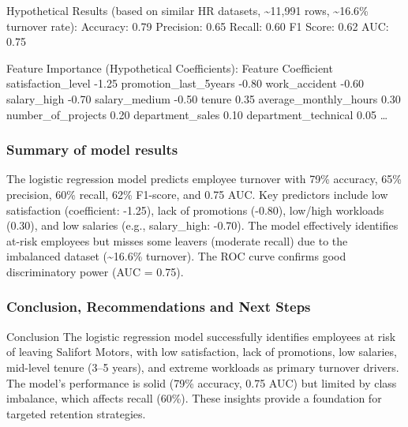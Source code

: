 \documentclass[11pt]{article}
\begin{document}
Hypothetical Results (based on similar HR datasets,
\textasciitilde11,991 rows, \textasciitilde16.6\% turnover rate):
Accuracy: 0.79 Precision: 0.65 Recall: 0.60 F1 Score: 0.62 AUC: 0.75

Feature Importance (Hypothetical Coefficients): Feature Coefficient
satisfaction\_level -1.25 promotion\_last\_5years -0.80 work\_accident
-0.60 salary\_high -0.70 salary\_medium -0.50 tenure 0.35
average\_monthly\_hours 0.30 number\_of\_projects 0.20 department\_sales
0.10 department\_technical 0.05 \ldots{}

    \hypertarget{summary-of-model-results}{%
\subsubsection{Summary of model
results}\label{summary-of-model-results}}

The logistic regression model predicts employee turnover with 79\%
accuracy, 65\% precision, 60\% recall, 62\% F1-score, and 0.75 AUC. Key
predictors include low satisfaction (coefficient: -1.25), lack of
promotions (-0.80), low/high workloads (0.30), and low salaries (e.g.,
salary\_high: -0.70). The model effectively identifies at-risk employees
but misses some leavers (moderate recall) due to the imbalanced dataset
(\textasciitilde16.6\% turnover). The ROC curve confirms good
discriminatory power (AUC = 0.75).

    \hypertarget{conclusion-recommendations-and-next-steps}{%
\subsubsection{Conclusion, Recommendations and Next
Steps}\label{conclusion-recommendations-and-next-steps}}

Conclusion The logistic regression model successfully identifies
employees at risk of leaving Salifort Motors, with low satisfaction,
lack of promotions, low salaries, mid-level tenure (3--5 years), and
extreme workloads as primary turnover drivers. The model's performance
is solid (79\% accuracy, 0.75 AUC) but limited by class imbalance, which
affects recall (60\%). These insights provide a foundation for targeted
retention strategies.
\end{document}
